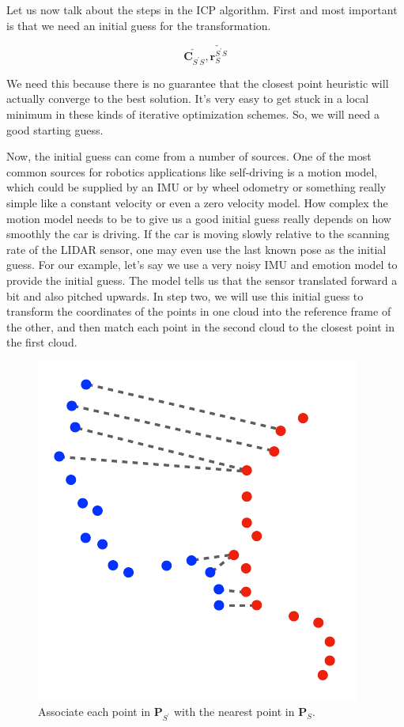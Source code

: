 Let us now talk about the steps
in the ICP algorithm. First and most
important is that we need an initial guess
for the transformation. 

\begin{equation}
\check{\mathbf{C}_{S^{'}S}}, \check{\mathbf{r}_{S}^{S^{'}S}} 
\end{equation}


We need this because there is no guarantee that the closest point heuristic will actually converge to
the best solution. It's very easy to get stuck in a local minimum in these kinds of
iterative optimization schemes. So, we will need
a good starting guess. 

Now, the initial guess can come from a number of sources. One of the most
common sources for robotics applications
like self-driving is a motion model, which could be
supplied by an IMU or by wheel odometry or
something really simple like a constant velocity or
even a zero velocity model. How complex the motion model
needs to be to give us a good initial guess really depends on how smoothly
the car is driving. If the car is moving
slowly relative to the scanning rate
of the LIDAR sensor, one may even use the last known pose
as the initial guess. For our example, let's say we use a very noisy IMU and emotion model to provide
the initial guess. The model tells us that
the sensor translated forward a bit and
also pitched upwards. In step two, we will use
this initial guess to transform the coordinates of the points in one cloud into the reference
frame of the other, and then match each point in the second cloud to the closest
point in the first cloud. 


\begin{figure}[!htb]
\begin{center}
\includegraphics[scale=0.280]{img/hardware/lidar_9.jpeg}
\end{center}
\caption{Associate each point in $\mathbf{P}_{S^{'}}$ with the nearest point in $\mathbf{P}_{S}$.}
\label{lidar_9}
\end{figure}


